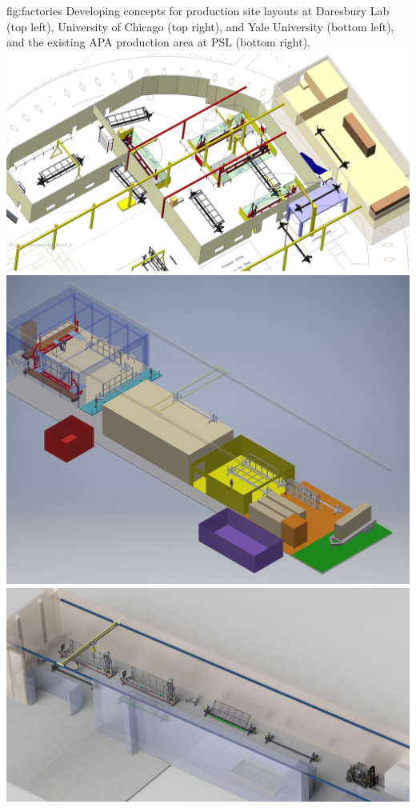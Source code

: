 \begin{dunefigure}{fig:factories}
{Developing concepts for production site layouts at Daresbury Lab (top left), University of Chicago (top right), and Yale University (bottom left), and the existing APA production area at PSL (bottom right).}
\includegraphics[height=0.23\textheight]{graphics/sp-apa-factory-daresbury.jpg} 
\includegraphics[height=0.23\textheight]{graphics/sp-apa-factory-chicago.jpg} \\
\vspace{1mm}
\includegraphics[height=0.225\textheight]{graphics/sp-apa-factory-yale.jpg}

\end{dunefigure}
